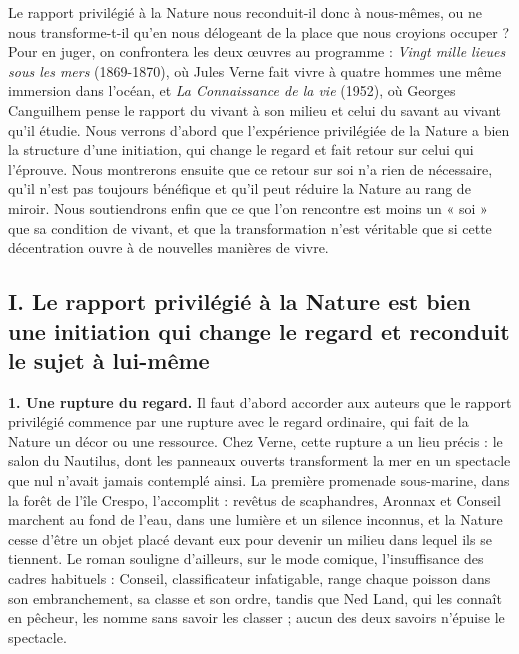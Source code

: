 \documentclass[11pt,a4paper]{article}
\begin{document}
Le rapport privilégié à la Nature nous reconduit-il donc à nous-mêmes, ou ne nous transforme-t-il qu'en nous délogeant de la place que nous croyions occuper ? Pour en juger, on confrontera les deux œuvres au programme : \emph{Vingt mille lieues sous les mers} (1869-1870), où Jules Verne fait vivre à quatre hommes une même immersion dans l'océan, et \emph{La Connaissance de la vie} (1952), où Georges Canguilhem pense le rapport du vivant à son milieu et celui du savant au vivant qu'il étudie. Nous verrons d'abord que l'expérience privilégiée de la Nature a bien la structure d'une initiation, qui change le regard et fait retour sur celui qui l'éprouve. Nous montrerons ensuite que ce retour sur soi n'a rien de nécessaire, qu'il n'est pas toujours bénéfique et qu'il peut réduire la Nature au rang de miroir. Nous soutiendrons enfin que ce que l'on rencontre est moins un « soi » que sa condition de vivant, et que la transformation n'est véritable que si cette décentration ouvre à de nouvelles manières de vivre.

\hypertarget{i.-le-rapport-priviluxe9giuxe9-uxe0-la-nature-est-bien-une-initiation-qui-change-le-regard-et-reconduit-le-sujet-uxe0-lui-muxeame}{%
\subsection{I. Le rapport privilégié à la Nature est bien une initiation qui change le regard et reconduit le sujet à lui-même}\label{i.-le-rapport-priviluxe9giuxe9-uxe0-la-nature-est-bien-une-initiation-qui-change-le-regard-et-reconduit-le-sujet-uxe0-lui-muxeame}}

\textbf{1. Une rupture du regard.} Il faut d'abord accorder aux auteurs que le rapport privilégié commence par une rupture avec le regard ordinaire, qui fait de la Nature un décor ou une ressource. Chez Verne, cette rupture a un lieu précis : le salon du Nautilus, dont les panneaux ouverts transforment la mer en un spectacle que nul n'avait jamais contemplé ainsi. La première promenade sous-marine, dans la forêt de l'île Crespo, l'accomplit : revêtus de scaphandres, Aronnax et Conseil marchent au fond de l'eau, dans une lumière et un silence inconnus, et la Nature cesse d'être un objet placé devant eux pour devenir un milieu dans lequel ils se tiennent. Le roman souligne d'ailleurs, sur le mode comique, l'insuffisance des cadres habituels : Conseil, classificateur infatigable, range chaque poisson dans son embranchement, sa classe et son ordre, tandis que Ned Land, qui les connaît en pêcheur, les nomme sans savoir les classer ; aucun des deux savoirs n'épuise le spectacle.
\end{document}
